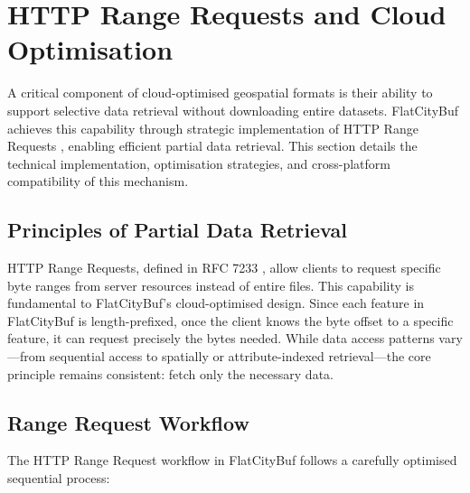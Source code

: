 
\section{HTTP Range Requests and Cloud Optimisation}
\label{methodology:http_range_requests}

A critical component of cloud-optimised geospatial formats is their ability to support selective data retrieval without downloading entire datasets. FlatCityBuf achieves this capability through strategic implementation of HTTP Range Requests \citep{http_range_requests}, enabling efficient partial data retrieval. This section details the technical implementation, optimisation strategies, and cross-platform compatibility of this mechanism.

\subsection{Principles of Partial Data Retrieval}
\label{methodology:http_range_requests:partial_retrieval_principles}

HTTP Range Requests, defined in RFC 7233 \citep{rfc_7233}, allow clients to request specific byte ranges from server resources instead of entire files. This capability is fundamental to FlatCityBuf's cloud-optimised design. Since each feature in FlatCityBuf is length-prefixed, once the client knows the byte offset to a specific feature, it can request precisely the bytes needed. While data access patterns vary—from sequential access to spatially or attribute-indexed retrieval—the core principle remains consistent: fetch only the necessary data.

\subsection{Range Request Workflow}
\label{methodology:http_range_requests:range_request_workflow}

The HTTP Range Request workflow in FlatCityBuf follows a carefully optimised sequential process:

